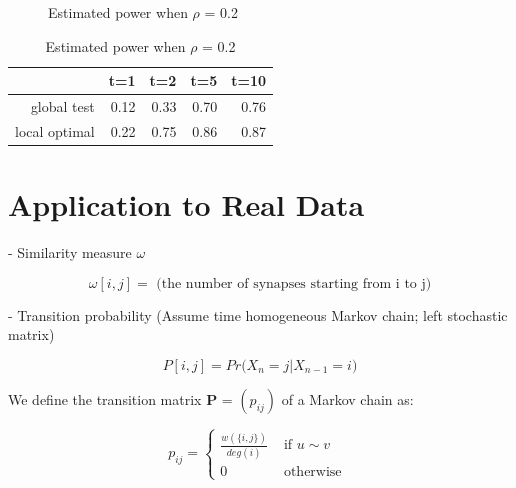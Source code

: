 \documentclass[12pt]{report}
\begin{document}
\begin{figure}[H]
\caption{Estimated power when $\rho$ = 0.2}
\label{fig:gh3}    
\end{figure}



\begin{table}[ht]
\centering
\begin{tabular}{rrrrr}
  \hline
 & t=1 & t=2 & t=5 & t=10 \\ 
  \hline
global test & 0.12 & 0.33 & 0.70 & 0.76 \\ 
  local optimal & 0.22 & 0.75 & 0.86 & 0.87 \\ 
   \hline
\end{tabular}
\caption{Estimated power when $\rho$ = 0.2}
\label{tab:gh3} 
\end{table}









\newpage
\section{Application to Real Data}

- Similarity measure $\omega$

$$\omega[i,j] = \mbox{ (the number of synapses starting from i to j)}$$
 

- Transition probability (Assume time homogeneous Markov chain; left stochastic matrix)

$$P[i,j] = Pr\big( X_{n} = j  | X_{n-1} = i \big)$$

We define the transition matrix \textbf{P} = $(p_{ij})$ of a Markov chain as:

$$p_{ij} = \left\{ \begin{array}{ll} \frac{w(\{ i, j\})}{ deg(i) } & \mbox{ if } u \sim v \\ 0 & \mbox{ otherwise }  \end{array}  \right.$$
\end{document}
